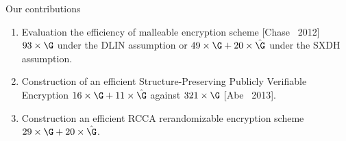 \begin{frame}{Our contributions}

  \begin{enumerate}
  \item\alert<+>{ Evaluation the efficiency of malleable encryption scheme [Chase \etal~2012] $93\times\G$ under the DLIN assumption or $49\times\G +20 \times\hat{\G}$ under the SXDH assumption. }
  \item\alert<+>{ Construction of an efficient Structure-Preserving Publicly Verifiable Encryption $16\times\G + 11\times\hat{\G}$ against $321\times\G$ [Abe \etal~2013].}
  \item\alert<+>{ Construction an efficient RCCA rerandomizable encryption scheme $29 \times\G + 20 \times\hat{\G}$.}
  \end{enumerate}
\end{frame}
